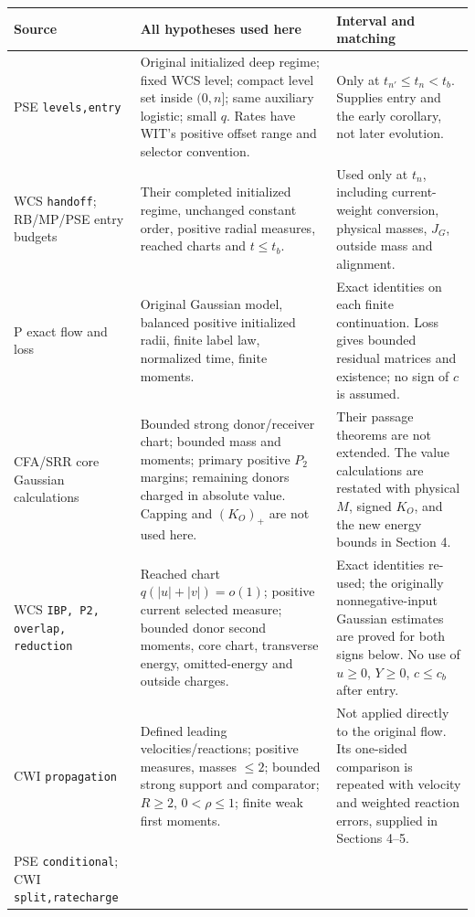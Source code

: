 \documentclass[11pt]{article}
\numberwithin{equation}{section}
\begin{document}
\small
\begin{longtable}{>{\raggedright\arraybackslash}p{}
 >{\raggedright\arraybackslash}p{}
 >{\raggedright\arraybackslash}p{}}
\toprule Source & All hypotheses used here & Interval and matching\\\midrule\endhead
PSE \texttt{levels,entry}
& Original initialized deep regime; fixed WCS level; compact level set
 inside \((0,n]\); same auxiliary logistic; small \(q\).
 Rates have WIT's positive offset range and selector convention.
& Only at \(t_{n'}\le t_n<t_b\). Supplies entry and the early
 corollary, not later evolution.\\
WCS \texttt{handoff}; RB/MP/PSE entry budgets
& Their completed initialized regime, unchanged constant order,
 positive radial measures, reached charts and \(t\le t_b\).
& Used only at \(t_n\), including current-weight conversion,
 physical masses, \(J_G\), outside mass and alignment.\\
P exact flow and loss
& Original Gaussian model, balanced positive initialized radii,
 finite label law, normalized time, finite moments.
& Exact identities on each finite continuation. Loss gives bounded
 residual matrices and existence; no sign of \(c\) is assumed.\\
CFA/SRR core Gaussian calculations
& Bounded strong donor/receiver chart; bounded mass and moments;
 primary positive \(P_2\) margins; remaining donors charged in
 absolute value. Capping and \((K_O)_+\) are not used here.
& Their passage theorems are not extended. The value calculations
 are restated with physical \(M\), signed \(K_O\), and the new
 energy bounds in Section 4.\\
WCS \texttt{IBP, P2, overlap, reduction}
& Reached chart \(q(|u|+|v|)=o(1)\); positive current selected
 measure; bounded donor second moments, core chart, transverse
 energy, omitted-energy and outside charges.
& Exact identities re-used; the originally nonnegative-input
 Gaussian estimates are proved for both signs below.
 No use of \(u\ge0\), \(Y\ge0\), \(c\le c_b\) after entry.\\
CWI \texttt{propagation}
& Defined leading velocities/reactions; positive measures,
 masses \(\le2\); bounded strong support and comparator;
 \(R\ge2\), \(0<\rho\le1\); finite weak first moments.
& Not applied directly to the original flow. Its one-sided
 comparison is repeated with velocity and weighted reaction
 errors, supplied in Sections 4--5.\\
PSE \texttt{conditional}; CWI \texttt{split,ratecharge}

\end{longtable}
\end{document}
